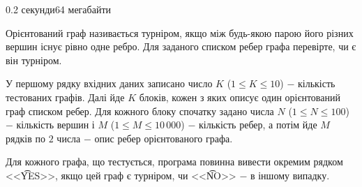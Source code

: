 \begin{problem}{}{}{}{0.2 секунди}{64 мегабайти}

Орієнтований граф називається турніром, якщо між будь-якою парою його різних вершин існує рівно одне ребро. 
Для заданого списком ребер графа перевірте, чи є він турніром.

\InputFile
У першому рядку вхідних даних записано число $K$ ($1 \le K \le 10$) $-$ кількість тестованих графів. 
Далі йде $K$ блоків, кожен з яких описує один орієнтований граф списком ребер. 
Для кожного блоку спочатку задано числа $N$ ($1 \le N \le 100$) $-$ кількість вершин і $M$ ($1 \le M \le 10\,000$) $-$
кількість ребер, а потім йде $M$ рядків по $2$ числа $-$ опис ребер орієнтованого графа.

\OutputFile
Для кожного графа, що тестується, програма повинна вивести окремим рядком <<{\t{YES}}>>, якщо цей граф
є турніром, чи <<{\t{NO}}>> $-$ в іншому випадку.


\Example

\begin{example}
%
\end{example}

\end{problem}

